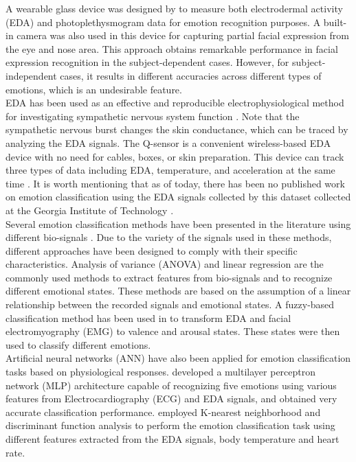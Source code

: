 A wearable glass device was designed by \cite{WearableDevice2016} to measure both electrodermal 
activity (EDA) and photoplethysmogram data for emotion recognition purposes. A built-in 
camera was also used in this device for capturing partial facial expression from the eye 
and nose area. This approach obtains remarkable performance in facial expression 
recognition in the subject-dependent cases. However, for subject-independent cases, 
it results in different accuracies across different types of emotions, which is an 
undesirable feature. \\

EDA has been used as an effective and reproducible electrophysiological method for 
investigating sympathetic nervous system function \cite{WearableDevice2016, AssociationBetween2013, SympatheticSkin1984, PrincipalComponent2000}. Note that the sympathetic nervous 
burst changes the skin conductance, which can be traced by analyzing the EDA signals\cite{SkinConduct2006, SympatheticSkin1981, DecodeChild2013}. The Q-sensor 
is a convenient wireless-based EDA device with no need for cables, boxes, or skin 
preparation. This device can track three types of data including EDA, temperature, 
and acceleration at the same time \cite{Validation2013}. It is worth mentioning that 
as of today, there has been no published work on emotion classification using the 
EDA signals collected by this dataset collected at the Georgia Institute of 
Technology \cite{DecodeChild2013}.\\

Several emotion classification methods have been presented in the literature using 
different bio-signals \cite{EmotionInten2014, EmotionResp2013, ElectAct2000, HeteroKnow2016}. Due to the variety of the signals used in these methods, 
different approaches have been designed to comply with their specific characteristics. 
Analysis of variance (ANOVA) and linear regression \cite{ElectAct2000} are the 
commonly used methods to extract features from bio-signals and to recognize different 
emotional states. These methods are based on the assumption of a linear relationship 
between the recorded signals and emotional states. A fuzzy-based classification 
method \cite{EmotionInten2014} has been used in to transform EDA and facial 
electromyography (EMG) to valence and arousal states. These states were then used 
to classify different emotions. \\

Artificial neural networks (ANN) have also been applied for emotion classification 
tasks based on physiological responses. \cite{MultPercep2007} developed a multilayer perceptron 
network (MLP) architecture capable of recognizing five emotions using various features 
from Electrocardiography (ECG) and EDA signals, and obtained very accurate classification 
performance. \cite{EmotionRecog2004} employed K-nearest neighborhood and discriminant 
function analysis to perform the emotion classification task using different features 
extracted from the EDA signals, body temperature and heart rate.\\


